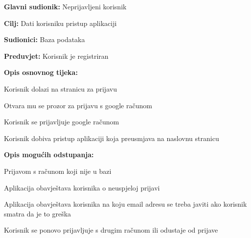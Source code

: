 					\noindent {}
					\begin{packed_item}
	
						\item \textbf{Glavni sudionik:} Neprijavljeni korisnik
						\item \textbf{Cilj:} Dati korisniku pristup aplikaciji
						\item \textbf{Sudionici:} Baza podataka
						\item \textbf{Preduvjet:} Korisnik je registriran
						\item \textbf{Opis osnovnog tijeka:}
						
						\item[] \begin{packed_enum}
	
							\item Korisnik dolazi na stranicu za prijavu
							\item Otvara mu se prozor za prijavu s google računom
							\item Korisnik se prijavljuje google računom
							\item Korisnik dobiva pristup aplikaciji koja preusmjava na naslovnu stranicu
						\end{packed_enum}
						
						\item \textbf{Opis mogućih odstupanja:}

						\item[] \begin{packed_item}

							\item[2.a] Prijavom s računom koji nije u bazi
							\item[] \begin{packed_enum}

								\item Aplikacija obavještava korisnika o neuspjeloj prijavi
								\item Aplikacija obavještava korisnika na koju email adresu se treba javiti ako korisnik smatra da je to greška
								\item Korisnik se ponovo prijavljuje s drugim računom ili odustaje od prijave

							\end{packed_enum}

						\end{packed_item}
					\end{packed_item}

